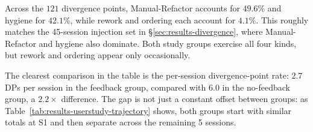 \begin{table}[htbp]
\centering
\small
{}
\caption{Per-participant divergence-point counts across the 30-session user study, grouped by feedback condition. The table reports aggregate per-kind totals; full per-session breakdowns are available in the reproducibility notebook (\texttt{tool/fixtures/notebooks/experiments.ipynb}).}
\label{tab:results-userstudy-distribution}
\end{table}

Across the $121$ divergence points, Manual-Refactor accounts for $49.6\%$ and hygiene for $42.1\%$, while rework and ordering each account for $4.1\%$. This roughly matches the 45-session injection set in \S\ref{sec:results-divergence}, where Manual-Refactor and hygiene also dominate. Both study groups exercise all four kinds, but rework and ordering appear only occasionally.

The clearest comparison in the table is the per-session divergence-point rate: $2.7$ DPs per session in the feedback group, compared with $6.0$ in the no-feedback group, a $2.2\times$ difference. The gap is not just a constant offset between groups: as Table~\ref{tab:results-userstudy-trajectory} shows, both groups start with similar totals at S1 and then separate across the remaining 5 sessions.

